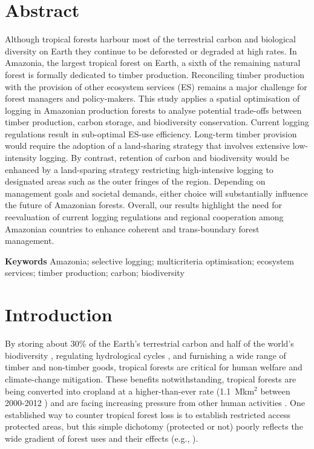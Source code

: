 \documentclass[12pt]{article}
\begin{document}
\section*{Abstract}

Although tropical forests harbour most of the terrestrial carbon and biological diversity on Earth they continue to be deforested or degraded at high rates. In Amazonia, the largest tropical forest on Earth, a sixth of the remaining natural forest is formally dedicated to timber production. Reconciling  timber production with the provision of other ecosystem services (ES) remains a major challenge for forest managers and policy-makers. This study applies a spatial optimisation of logging in Amazonian production forests to analyse potential trade-offs between timber production, carbon storage, and biodiversity conservation. Current logging regulations result in sub-optimal ES-use efficiency. Long-term timber provision would require the adoption of a land-sharing strategy that involves extensive low-intensity logging. By contrast, retention of carbon and biodiversity would be enhanced by a land-sparing strategy restricting high-intensive logging to designated areas such as the outer fringes of the region. Depending on management goals and societal demands, either choice will substantially influence the future of Amazonian forests. Overall, our results highlight the need for reevaluation of current logging regulations and regional cooperation among Amazonian countries to enhance coherent and trans-boundary forest management.

\vspace{1cm}
\textbf{Keywords} Amazonia; selective logging; multicriteria optimisation; ecosystem services; timber production; carbon; biodiversity


\section*{Introduction}

By storing about 30\% of the Earth’s terrestrial carbon \cite{Pan2013} and half of the world’s biodiversity \cite{Pimm2014}, regulating hydrological cycles \cite{Fisher2009a}, and furnishing a wide range of timber and non-timber goods, tropical forests are critical for human welfare and climate-change mitigation. These benefits notwithstanding, tropical forests are being converted into cropland at a higher-than-ever rate (1.1~Mkm$^2$ between 2000-2012 \cite{Hansen2013}) and are facing increasing pressure from other human activities \cite{Lewis2015}. One established way to counter tropical forest loss is to establish restricted access protected areas, but this simple dichotomy (protected or not) poorly reflects the wide gradient of forest uses and their effects (e.g., \cite{DeCastroSolar2015,Gibson2011}). 
\end{document}
